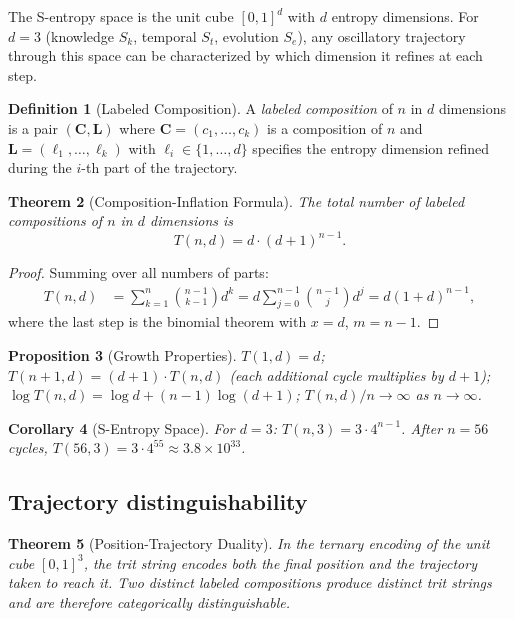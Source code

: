 \documentclass[twocolumn,10pt,a4paper]{article}
\theoremstyle{thmstyle}
\newtheorem{theorem}{Theorem}[section]
\newtheorem{proposition}[theorem]{Proposition}
\newtheorem{corollary}[theorem]{Corollary}
\theoremstyle{definition}
\newtheorem{definition}[theorem]{Definition}
\theoremstyle{remark}
\begin{document}
The S-entropy space is the unit cube $[0,1]^d$ with $d$ entropy dimensions.
For $d = 3$ (knowledge $S_k$, temporal $S_t$, evolution $S_e$), any
oscillatory trajectory through this space can be characterized by which
dimension it refines at each step.

\begin{definition}[Labeled Composition]
A \emph{labeled composition} of $n$ in $d$ dimensions is a pair
$(\mathbf{C}, \mathbf{L})$ where $\mathbf{C} = (c_1,\ldots,c_k)$ is a
composition of $n$ and $\mathbf{L} = (\ell_1,\ldots,\ell_k)$ with
$\ell_i \in \{1,\ldots,d\}$ specifies the entropy dimension refined during
the $i$-th part of the trajectory.
\end{definition}

\begin{theorem}[Composition-Inflation Formula]
\label{thm:inflation}
The total number of labeled compositions of $n$ in $d$ dimensions is
\begin{equation}
\boxed{T(n,d) = d \cdot (d+1)^{n-1}.}
\label{eq:inflation}
\end{equation}
\end{theorem}

\begin{proof}
Summing over all numbers of parts:
\begin{align}
T(n,d) &= \sum_{k=1}^{n} \binom{n-1}{k-1} d^k
= d \sum_{j=0}^{n-1} \binom{n-1}{j} d^j
= d(1+d)^{n-1},
\end{align}
where the last step is the binomial theorem with $x = d$, $m = n-1$.
\end{proof}

\begin{proposition}[Growth Properties]
\label{prop:growth}
$T(1,d) = d$;\;
$T(n+1,d) = (d+1)\cdot T(n,d)$ (each additional cycle multiplies by $d+1$);\;
$\log T(n,d) = \log d + (n-1)\log(d+1)$;\;
$T(n,d)/n \to \infty$ as $n \to \infty$.
\end{proposition}

\begin{corollary}[S-Entropy Space]
For $d = 3$: $T(n,3) = 3 \cdot 4^{n-1}$.
After $n = 56$ cycles, $T(56,3) = 3 \cdot 4^{55} \approx 3.8 \times 10^{33}$.
\end{corollary}

\subsection{Trajectory distinguishability}

\begin{theorem}[Position-Trajectory Duality]
\label{thm:duality}
In the ternary encoding of the unit cube $[0,1]^3$, the trit string encodes
both the final position and the trajectory taken to reach it. Two distinct
labeled compositions produce distinct trit strings and are therefore
categorically distinguishable.
\end{theorem}
\end{document}
